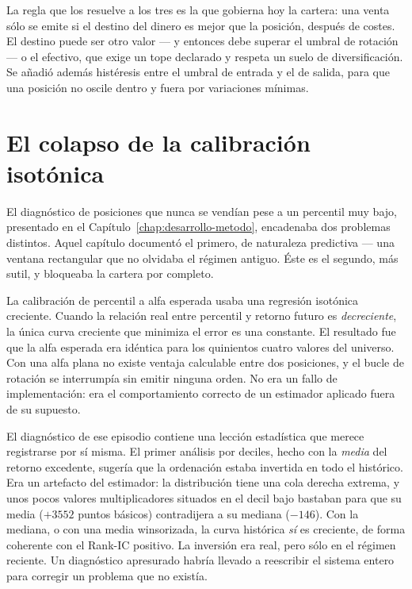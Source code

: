 La regla que los resuelve a los tres es la que gobierna hoy la cartera: una venta sólo se emite si
el destino del dinero es mejor que la posición, después de costes. El destino puede ser otro valor
--- y entonces debe superar el umbral de rotación --- o el efectivo, que exige un tope declarado y
respeta un suelo de diversificación. Se añadió además histéresis entre el umbral de entrada y el de
salida, para que una posición no oscile dentro y fuera por variaciones mínimas.

\section{El colapso de la calibración isotónica}

El diagnóstico de posiciones que nunca se vendían pese a un percentil muy bajo, presentado en el
Capítulo~\ref{chap:desarrollo-metodo}, encadenaba dos problemas distintos. Aquel capítulo documentó
el primero, de naturaleza predictiva --- una ventana rectangular que no olvidaba el régimen
antiguo. Éste es el segundo, más sutil, y bloqueaba la cartera por completo.

La calibración de percentil a alfa esperada usaba una regresión isotónica creciente. Cuando la
relación real entre percentil y retorno futuro es \emph{decreciente}, la única curva creciente que
minimiza el error es una constante. El resultado fue que la alfa esperada era idéntica para los
quinientos cuatro valores del universo. Con una alfa plana no existe ventaja calculable entre dos
posiciones, y el bucle de rotación se interrumpía sin emitir ninguna orden. No era un fallo de
implementación: era el comportamiento correcto de un estimador aplicado fuera de su supuesto.

El diagnóstico de ese episodio contiene una lección estadística que merece registrarse por sí misma.
El primer análisis por deciles, hecho con la \emph{media} del retorno excedente, sugería que la
ordenación estaba invertida en todo el histórico. Era un artefacto del estimador: la distribución
tiene una cola derecha extrema, y unos pocos valores multiplicadores situados en el decil bajo
bastaban para que su media (${+}3552$ puntos básicos) contradijera a su mediana (${-}146$). Con la
mediana, o con una media winsorizada, la curva histórica \emph{sí} es creciente, de forma coherente
con el Rank-IC positivo. La inversión era real, pero sólo en el régimen reciente. Un diagnóstico
apresurado habría llevado a reescribir el sistema entero para corregir un problema que no existía.

